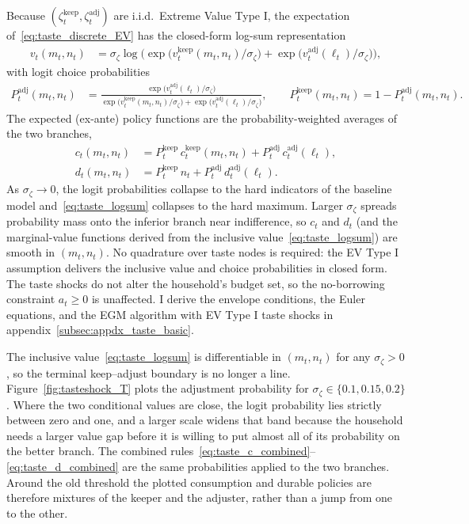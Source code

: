 Because $(\zeta_t^{\text{keep}},\zeta_t^{\text{adj}})$ are i.i.d.\ Extreme Value Type I, the expectation of~\eqref{eq:taste_discrete_EV} has the closed-form log-sum representation
\begin{align}
	v_t(m_t,n_t)
	&= \sigma_\zeta \log\Big(
		\exp\big(v_t^{\text{keep}}(m_t,n_t)/\sigma_\zeta\big)
		+ \exp\big(v_t^{\text{adj}}(\ell_t)/\sigma_\zeta\big)
	\Big), \label{eq:taste_logsum}
\end{align}
with logit choice probabilities
\begin{align}
	P_t^{\text{adj}}(m_t,n_t)
	&= \frac{\exp\big(v_t^{\text{adj}}(\ell_t)/\sigma_\zeta\big)}
	{\exp\big(v_t^{\text{keep}}(m_t,n_t)/\sigma_\zeta\big)
	+ \exp\big(v_t^{\text{adj}}(\ell_t)/\sigma_\zeta\big)},
	\qquad
	P_t^{\text{keep}}(m_t,n_t) = 1 - P_t^{\text{adj}}(m_t,n_t). \label{eq:taste_logit}
\end{align}
The expected (ex-ante) policy functions are the probability-weighted averages of the two branches,
\begin{align}
	c_t(m_t,n_t) &= P_t^{\text{keep}}\, c_t^{\text{keep}}(m_t,n_t) + P_t^{\text{adj}}\, c_t^{\text{adj}}(\ell_t), \label{eq:taste_c_combined}\\
	d_t(m_t,n_t) &= P_t^{\text{keep}}\, n_t + P_t^{\text{adj}}\, d_t^{\text{adj}}(\ell_t). \label{eq:taste_d_combined}
\end{align}
As $\sigma_\zeta \to 0$, the logit probabilities collapse to the hard indicators of the baseline model and~\eqref{eq:taste_logsum} collapses to the hard maximum. Larger $\sigma_\zeta$ spreads probability mass onto the inferior branch near indifference, so $c_t$ and $d_t$ (and the marginal-value functions derived from the inclusive value~\eqref{eq:taste_logsum}) are smooth in $(m_t,n_t)$. No quadrature over taste nodes is required: the EV Type I assumption delivers the inclusive value and choice probabilities in closed form. The taste shocks do not alter the household's budget set, so the no-borrowing constraint $a_t \ge 0$ is unaffected. I derive the envelope conditions, the Euler equations, and the EGM algorithm with EV Type I taste shocks in appendix~\ref{subsec:appdx_taste_basic}.

The inclusive value~\eqref{eq:taste_logsum} is differentiable in $(m_t,n_t)$ for any $\sigma_\zeta > 0$, so the terminal keep--adjust boundary is no longer a line. Figure~\ref{fig:tasteshock_T} plots the adjustment probability for $\sigma_\zeta \in \{0.1, 0.15, 0.2\}$. Where the two conditional values are close, the logit probability lies strictly between zero and one, and a larger scale widens that band because the household needs a larger value gap before it is willing to put almost all of its probability on the better branch. The combined rules~\eqref{eq:taste_c_combined}--\eqref{eq:taste_d_combined} are the same probabilities applied to the two branches. Around the old threshold the plotted consumption and durable policies are therefore mixtures of the keeper and the adjuster, rather than a jump from one to the other.

